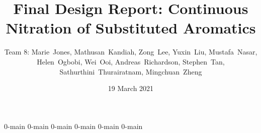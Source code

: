 \documentclass{nitroma-report}
\title{Final Design Report: Continuous Nitration of Substituted Aromatics}
\author{Team 8: Marie~Jones, Mathusan~Kandiah, Zong~Lee, Yuxin~Liu, Mustafa~Nasar, Helen~Ogbobi, Wei~Ooi, Andreas~Richardson, Stephen~Tan, Sathurthini~Thurairatnam, Mingchuan~Zheng}
\date{19 March 2021}
\begin{document}
\maketitle



\tableofcontents
\listoffigures
\listoftables

{0-main}
{0-main}
{0-main}
{0-main}
{0-main}
{0-main}
\end{document}
